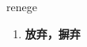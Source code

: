 
\begin{frame}
{\huge renege}
\begin{center}
\begin{enumerate}\Large
  \item \textbf{放弃，摒弃}
\end{enumerate}
\end{center}
\end{frame}
